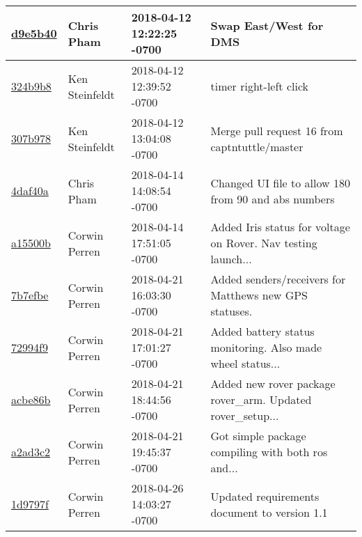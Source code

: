 \begin{center}
\begin{tabular}{l l l l}
\href{https://github.com/OSURoboticsClub/Rover_2017_2018/commit/d9e5b403d7247922864e81703aad900eab72918a}{d9e5b40} & Chris Pham & 2018-04-12 12:22:25 -0700 &Swap East/West for DMS\\\hline
\href{https://github.com/OSURoboticsClub/Rover_2017_2018/commit/324b9b89874d7253c565fc5ff8a750d2023d4f0b}{324b9b8} & Ken Steinfeldt & 2018-04-12 12:39:52 -0700 &timer right-left click\\\hline
\href{https://github.com/OSURoboticsClub/Rover_2017_2018/commit/307b978fb9fb349f1ee983808c24aaaec060375e}{307b978} & Ken Steinfeldt & 2018-04-12 13:04:08 -0700 &Merge pull request 16 from captntuttle/master\\\hline
\href{https://github.com/OSURoboticsClub/Rover_2017_2018/commit/4daf40a229b1da9380a242414cc08573f6a44ca4}{4daf40a} & Chris Pham & 2018-04-14 14:08:54 -0700 &Changed UI file to allow 180 from 90 and abs numbers\\\hline
\href{https://github.com/OSURoboticsClub/Rover_2017_2018/commit/a15500b4c586db82800a5fba1a2078716b3cc954}{a15500b} & Corwin Perren & 2018-04-14 17:51:05 -0700 &Added Iris status for voltage on Rover. Nav testing launch...\\\hline
\href{https://github.com/OSURoboticsClub/Rover_2017_2018/commit/7b7efbe37a588da269b8ca870ed949a518feade4}{7b7efbe} & Corwin Perren & 2018-04-21 16:03:30 -0700 &Added senders/receivers for Matthews new GPS statuses.\\\hline
\href{https://github.com/OSURoboticsClub/Rover_2017_2018/commit/72994f9c9c61fe490c17f003dbc40a750f0ef988}{72994f9} & Corwin Perren & 2018-04-21 17:01:27 -0700 &Added battery status monitoring. Also made wheel status...\\\hline
\href{https://github.com/OSURoboticsClub/Rover_2017_2018/commit/acbe86bd07c84bf9b7b31d980f5d337769a70ccc}{acbe86b} & Corwin Perren & 2018-04-21 18:44:56 -0700 &Added new rover package rover\_arm. Updated rover\_setup...\\\hline
\href{https://github.com/OSURoboticsClub/Rover_2017_2018/commit/a2ad3c2c9a43aeba8a0419087997820dc692e003}{a2ad3c2} & Corwin Perren & 2018-04-21 19:45:37 -0700 &Got simple package compiling with both ros and...\\\hline
\href{https://github.com/OSURoboticsClub/Rover_2017_2018/commit/1d9797f00b7366ae4998919edc9d4d3564f30de4}{1d9797f} & Corwin Perren & 2018-04-26 14:03:27 -0700 &Updated requirements document to version 1.1\\\hline
\end{tabular}
\end{center}